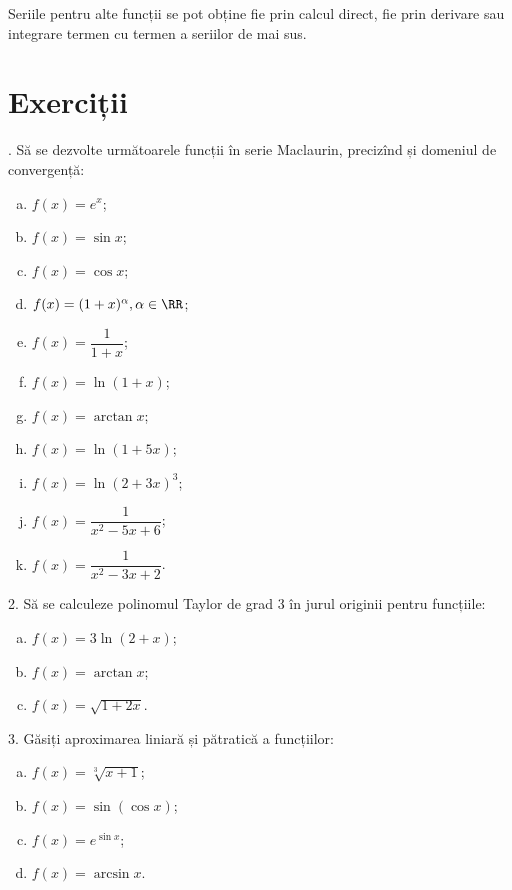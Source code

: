 Seriile pentru alte funcții se pot obține fie prin calcul direct, fie
prin derivare sau integrare termen cu termen a seriilor de mai sus.

\section{Exerciții}

\indent{}. Să se dezvolte următoarele funcții în serie Maclaurin, precizînd și
domeniul de convergență:
\begin{enumerate}[(a)]
    \item $ f(x) = e^x $;
    \item $ f(x) = \sin x $;
    \item $ f(x) = \cos x $;
    \item $ f(x) = (1 + x)^\alpha, \alpha \in \RR $;
    \item $ f(x) = \dfrac{1}{1 + x} $;
    \item $ f(x) = \ln(1 + x) $;
    \item $ f(x) = \arctan x $;
    \item $ f(x) = \ln(1 + 5x)$;
    \item $ f(x) = \ln(2 + 3x)^3 $;
    \item $ f(x) = \dfrac{1}{x^2 - 5x + 6} $;
    \item $ f(x) = \dfrac{1}{x^2 - 3x + 2} $.
\end{enumerate}

\vspace{0.5cm}

2. Să se calculeze polinomul Taylor de grad 3 în jurul originii
pentru funcțiile:
\begin{enumerate}[(a)]
\item $ f(x) = 3 \ln(2 + x) $;
\item $ f(x) = \arctan x $;
\item $ f(x) = \sqrt{1 + 2x} $.
\end{enumerate}

\vspace{0.5cm}

3. Găsiți aproximarea liniară și pătratică a funcțiilor:
\begin{enumerate}[(a)]
\item $ f(x) = \sqrt[3]{x + 1} $;
\item $ f(x) = \sin(\cos x) $;
\item $ f(x) = e^{\sin x} $;
\item $ f(x) = \arcsin x $.
\end{enumerate}

